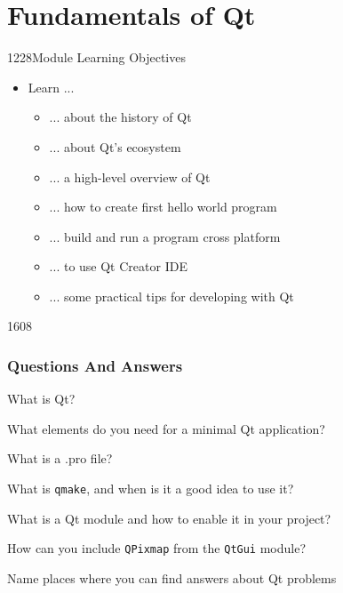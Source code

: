 %
%
%
%

\section{Fundamentals of Qt}

\begin{slide}{1228}{Module Learning Objectives}
  \label{fundamentals}
  \begin{itemize}
  \item Learn ...
    \begin{itemize}
    \item ... about the history of Qt
    \item ... about Qt's ecosystem
    \item ... a high-level overview of Qt
    \item ... how to create first hello world program
    \item ... build and run a program cross platform
    \item ... to use Qt Creator IDE
    \item ... some practical tips for developing with Qt
    \end{itemize}
  \end{itemize}
\end{slide}







\begin{slide}{1608}
  \frametitle{Questions And Answers}
  \begin{questionize}
  \item What is Qt?
  \item What elements do you need for a minimal Qt application?
  \item What is a .pro file?
  \item What is \texttt{qmake}, and when is it a good idea to use it?
  \item What is a Qt module and how to enable it in your project?
  \item How can you include \texttt{QPixmap} from the \texttt{QtGui} module?
  \item Name places where you can find answers about Qt problems
  \end{questionize}
\end{slide}



% 
